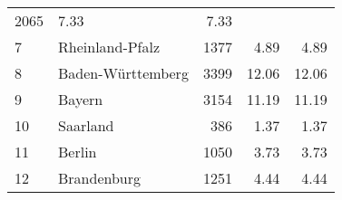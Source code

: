 \begin{longtable}{lXrrr}
       \num{2065} &
       \num[round-mode=places,round-precision=2]{7,33} &
         \num[round-mode=places,round-precision=2]{7,33} \\

     7 &
     \multicolumn{1}{X}{ Rheinland-Pfalz   } &


       \num{1377} &
       \num[round-mode=places,round-precision=2]{4,89} &
         \num[round-mode=places,round-precision=2]{4,89} \\

     8 &
     \multicolumn{1}{X}{ Baden-Württemberg   } &


       \num{3399} &
       \num[round-mode=places,round-precision=2]{12,06} &
         \num[round-mode=places,round-precision=2]{12,06} \\

     9 &
     \multicolumn{1}{X}{ Bayern   } &


       \num{3154} &
       \num[round-mode=places,round-precision=2]{11,19} &
         \num[round-mode=places,round-precision=2]{11,19} \\

     10 &
     \multicolumn{1}{X}{ Saarland   } &


       \num{386} &
       \num[round-mode=places,round-precision=2]{1,37} &
         \num[round-mode=places,round-precision=2]{1,37} \\

     11 &
     \multicolumn{1}{X}{ Berlin   } &


       \num{1050} &
       \num[round-mode=places,round-precision=2]{3,73} &
         \num[round-mode=places,round-precision=2]{3,73} \\

     12 &
     \multicolumn{1}{X}{ Brandenburg   } &


       \num{1251} &
       \num[round-mode=places,round-precision=2]{4,44} &
         \num[round-mode=places,round-precision=2]{4,44} \\


\end{longtable}
